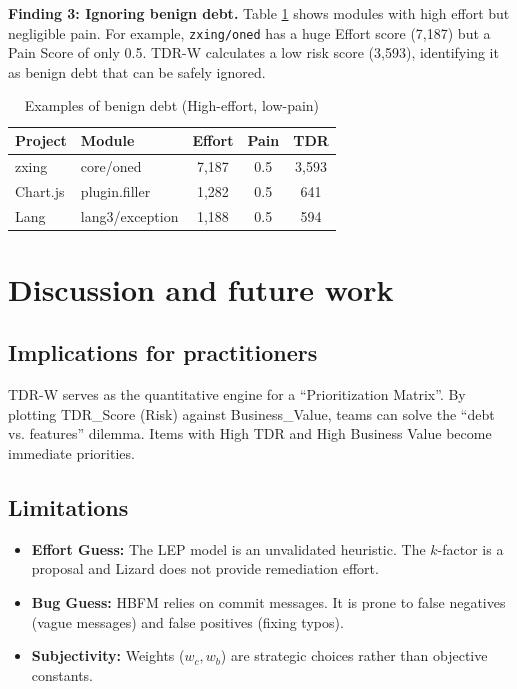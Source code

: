 \documentclass[journal]{IEEEtran}
\begin{document}
\textbf{Finding 3: Ignoring benign debt.} Table \ref{tab2} shows modules with high effort but negligible pain. For example, \texttt{zxing/oned} has a huge Effort score (7,187) but a Pain Score of only 0.5. TDR-W calculates a low risk score (3,593), identifying it as benign debt that can be safely ignored.

\begin{table}[htbp]
\caption{Examples of benign debt (High-effort, low-pain)}
\begin{center}
\begin{tabular}{|l|l|c|c|c|}
\hline
\textbf{Project} & \textbf{Module} & \textbf{Effort} & \textbf{Pain} & \textbf{TDR} \\
\hline
zxing & core/oned & 7,187 & 0.5 & 3,593 \\
Chart.js & plugin.filler & 1,282 & 0.5 & 641 \\
Lang & lang3/exception & 1,188 & 0.5 & 594 \\
\hline
\end{tabular}
\label{tab2}
\end{center}
\end{table}

\section{Discussion and future work}
\subsection{Implications for practitioners}
TDR-W serves as the quantitative engine for a ``Prioritization Matrix''. By plotting TDR\_Score (Risk) against Business\_Value, teams can solve the ``debt vs. features'' dilemma. Items with High TDR and High Business Value become immediate priorities.

\subsection{Limitations}
\begin{itemize}
    \item \textbf{Effort Guess:} The LEP model is an unvalidated heuristic. The $k$-factor is a proposal and Lizard does not provide remediation effort.
    \item \textbf{Bug Guess:} HBFM relies on commit messages. It is prone to false negatives (vague messages) and false positives (fixing typos).
    \item \textbf{Subjectivity:} Weights ($w_c, w_b$) are strategic choices rather than objective constants.
\end{itemize}
\end{document}
